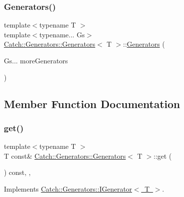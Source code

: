 \subsubsection{\texorpdfstring{Generators()}{Generators()}}
{\footnotesize\ttfamily template$<$typename T $>$ \\
template$<$typename... Gs$>$ \\
\mbox{\hyperlink{class_catch_1_1_generators_1_1_generators}{Catch\+::\+Generators\+::\+Generators}}$<$ T $>$\+::\mbox{\hyperlink{class_catch_1_1_generators_1_1_generators}{Generators}} (\begin{DoxyParamCaption}\item[{Gs...}]{more\+Generators }\end{DoxyParamCaption})\hspace{0.3cm}{\ttfamily [inline]}}



\subsection{Member Function Documentation}
\mbox{\label{class_catch_1_1_generators_1_1_generators_a66705482b7efa88cae6e6b7062d5de6a}} 
\subsubsection{\texorpdfstring{get()}{get()}}
{\footnotesize\ttfamily template$<$typename T $>$ \\
T const\& \mbox{\hyperlink{class_catch_1_1_generators_1_1_generators}{Catch\+::\+Generators\+::\+Generators}}$<$ T $>$\+::get (\begin{DoxyParamCaption}{ }\end{DoxyParamCaption}) const\hspace{0.3cm}{\ttfamily [inline]}, {\ttfamily [override]}, {\ttfamily [virtual]}}



Implements \mbox{\hyperlink{struct_catch_1_1_generators_1_1_i_generator_a525d381fc9249a885b075a0632a8579a}{Catch\+::\+Generators\+::\+I\+Generator$<$ T $>$}}.

\mbox{\label{class_catch_1_1_generators_1_1_generators_ad127fd2a07347b527f79ab3b78bd40fb}} 
